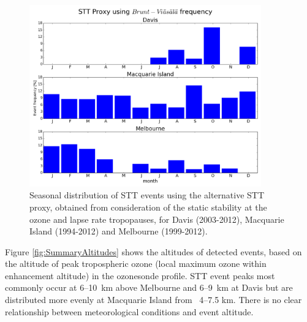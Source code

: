   \begin{figure}[t]
    \includegraphics[width=10cm]{figures/AndrewProxySTT.png}
    \caption{Seasonal distribution of STT events using the alternative STT proxy, obtained from consideration of the static stability at the ozone and lapse rate tropopauses, for Davis (2003-2012), Macquarie Island (1994-2012) and Melbourne (1999-2012).}
    \label{fig:AndrewProxySTT}
    
  \end{figure}
  
  Figure \ref{fig:SummaryAltitudes} shows the altitudes of detected events, based on the altitude of peak tropospheric ozone (local maximum ozone within enhancement altitude) in the ozonesonde profile.
  STT event peaks most commonly occur at 6--10~km above Melbourne and 6--9~km at Davis but are distributed more evenly at Macquarie Island from ~4--7.5 km.
  There is no clear relationship between meteorological conditions and event altitude.
  
